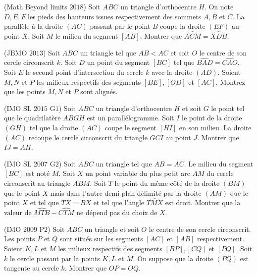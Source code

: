 \begin{exo}
(Math Beyond limits $2018$)
Soit $ABC$ un triangle d'orthocentre $H$. On note $D,E,F$ les pieds des hauteurs issues respectivement des sommets $A,B$ et $C$. La parallèle à la droite $(AC)$ passant par le point $B$ coupe la droite $(EF)$ au point $X$. Soit $M$ le milieu du segment $[AB]$. Montrer que $\widehat{ACM}=\widehat{XDB}$.
\end{exo}


\begin{exo}
(JBMO $2013$)
Soit $ABC$ un triangle tel que $AB<AC$ et soit $O$ le centre de son cercle circonscrit $k$. Soit $D$ un point du segment $[BC]$ tel que $\widehat{BAD}=\widehat{CAO}$. Soit $E$ le second point d'intersection du cercle $k$ avec la droite $(AD)$. Soient $M,N$ et $P$ les milieux respectifs des segments $[BE], [OD]$ et $[AC]$. Montrez que les points $M,N$ et $P$ sont align\'es.
\end{exo}


\begin{exo}
(IMO SL $2015$ G$1$)
Soit $ABC$ un triangle d'orthocentre $H$ et soit $G$ le point tel que le quadrilatère $ABGH$ est un parall\'elogramme. Soit $I$ le point de la droite $(GH)$ tel que la droite $(AC)$ coupe le segment $[HI]$ en son milieu. La droite $(AC)$ recoupe le cercle circonscrit du triangle $GCI$ au point $J$. Montrer que $IJ=AH$.
\end{exo}


\begin{exo}
(IMO SL $2007$ G$2$)
Soit $ABC$ un triangle tel que $AB=AC$. Le milieu du segment $[BC]$ est noté $M$. Soit $X$ un point variable du plus petit arc $AM$ du cercle circonscrit au triangle $ABM$. Soit $T$ le point du m\^eme c\^ot\'e de la droite $(BM)$ que le point $X$ mais dans l'autre demi-plan d\'elimit\'e par la droite $(AM)$ que le point $X$ et tel que $TX=BX$ et tel que l'angle $\widehat{TMX}$ est droit. Montrer que la valeur de $\widehat{MTB}-\widehat{CTM}$ ne dépend pas du choix de $X$.
\end{exo}


\begin{exo}
(IMO $2009$ P$2$)
Soit $ABC$ un triangle et soit $O$ le centre de son cercle circonscrit. Les points $P$ et $Q$ sont situés sur les segments $[AC]$ et $[AB]$ respectivement. Soient $K,L$ et $M$ les milieux respectifs des segments $[BP],[CQ]$ et $[PQ]$. Soit $k$ le cercle passant par la points $K,L$ et $M$. On suppose que la droite $(PQ)$ est tangente au cercle $k$. Montrer que $OP=OQ$.
\end{exo}


